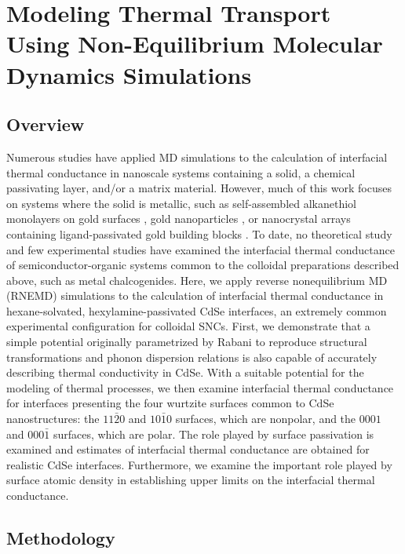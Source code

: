 \section{Modeling Thermal Transport Using Non-Equilibrium Molecular Dynamics Simulations}

\subsection{Overview}

Numerous studies have applied MD simulations to the calculation of interfacial thermal conductance in nanoscale systems containing a solid, a chemical passivating layer, and/or a matrix material. However, much of this work focuses on systems where the solid is metallic, such as self-assembled alkanethiol monolayers on gold surfaces \cite{doi:10.1021/jp2073478, luo2010equilibrium, Luo20101}, gold nanoparticles \cite{doi:10.1021/jp410054j, doi:10.1021/ct500221u}, or nanocrystal arrays containing ligand-passivated gold building blocks \cite{ong2013surface, doi:10.1021/jp4120157}.  To date, no theoretical study and few experimental studies have examined the interfacial thermal conductance of semiconductor-organic systems common to the colloidal preparations described above, such as metal chalcogenides. Here, we apply reverse nonequilibrium MD (RNEMD) simulations to the calculation of interfacial thermal conductance in hexane-solvated, hexylamine-passivated CdSe interfaces, an extremely common experimental configuration for colloidal SNCs. First, we demonstrate that a simple potential originally parametrized by Rabani \cite{:/content/aip/journal/jcp/116/1/10.1063/1.1424321} to reproduce structural transformations and phonon dispersion relations is also capable of accurately describing thermal conductivity in CdSe. With a suitable potential for the modeling of thermal processes, we then examine interfacial thermal conductance for interfaces presenting the four wurtzite surfaces common to CdSe nanostructures: the $11\bar{2}0$ and $10\bar{1}0$ surfaces, which are nonpolar, and the $0001$ and $000\bar{1}$ surfaces, which are polar.  The role played by surface passivation is examined and estimates of interfacial thermal conductance are obtained for realistic CdSe interfaces. Furthermore, we examine the important role played by surface atomic density in establishing upper limits on the interfacial thermal conductance.

\subsection{Methodology}

